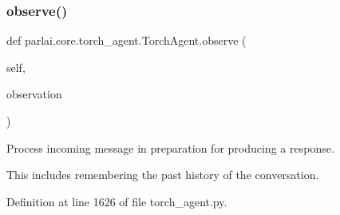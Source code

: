\mbox{\label{classparlai_1_1core_1_1torch__agent_1_1TorchAgent_a87b18f0d6ab11be3c49375af072d0d33}} 
\subsubsection{\texorpdfstring{observe()}{observe()}}
{\footnotesize\ttfamily def parlai.\+core.\+torch\+\_\+agent.\+Torch\+Agent.\+observe (\begin{DoxyParamCaption}\item[{}]{self,  }\item[{}]{observation }\end{DoxyParamCaption})}

\begin{DoxyVerb}Process incoming message in preparation for producing a response.

This includes remembering the past history of the conversation.
\end{DoxyVerb}
 

Definition at line 1626 of file torch\+\_\+agent.\+py.


